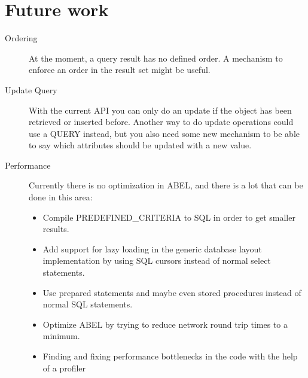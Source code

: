 \section{Future work}
\begin{description}
 \item [Ordering] At the moment, a query result has no defined order. A mechanism to enforce an order in the result set might be useful.
 \item [Update Query] With the current API you can only do an update if the object has been retrieved or inserted before. 
Another way to do update operations could use a QUERY instead, but you also need some new mechanism to be able to say which attributes should be updated with a new value.
 \item [Performance] Currently there is no optimization in ABEL, and there is a lot that can be done in this area:
 \begin{itemize}
  \item Compile PREDEFINED\_CRITERIA to SQL in order to get smaller results.
 \item Add support for lazy loading in the generic database layout implementation by using SQL cursors instead of normal select statements.
 \item Use prepared statements and maybe even stored procedures instead of normal SQL statements.
 \item Optimize ABEL by trying to reduce network round trip times to a minimum.
 \item Finding and fixing performance bottlenecks in the code with the help of a profiler
\end{itemize}


\end{description}
